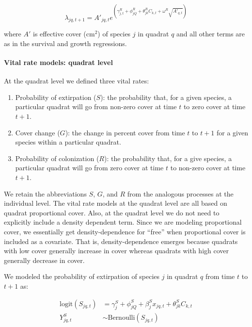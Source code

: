 \documentclass[12pt,]{article}
\begin{document}
\begin{equation}
\lambda_{jq,t+1} = A'_{jq,t}e^{(\gamma^{R}_{j,t} + \phi^{R}_{jQ} + \theta^{R}_{jk}C_{k,t} + \omega^{R}\sqrt{A'_{q,t}})}
\end{equation}

where $A'$ is effective cover ($\text{cm}^2$) of species $j$ in quadrat
$q$ and all other terms are as in the survival and growth regressions.

\paragraph{Vital rate models: quadrat
level}\label{vital-rate-models-quadrat-level}

At the quadrat level we defined three vital rates:

\begin{enumerate}
\def\labelenumi{\arabic{enumi}.}
\itemsep1pt\parskip0pt
\item
  Probability of extirpation ($S$): the probability that, for a given
  species, a particular quadrat will go from non-zero cover at time $t$
  to zero cover at time $t+1$.
\item
  Cover change ($G$): the change in percent cover from time $t$ to $t+1$
  for a given species within a particular quadrat.
\item
  Probability of colonization ($R$): the probability that, for a give
  species, a particular quadrat will go from zero cover at time $t$ to
  non-zero cover at time $t+1$.
\end{enumerate}

We retain the abbreviations $S$, $G$, and $R$ from the analogous
processes at the individual level. The vital rate models at the quadrat
level are all based on quadrat proportional cover. Also, at the quadrat
level we do not need to explicitly include a density dependent term.
Since we are modeling proportional cover, we essentially get
density-dependence for ``free'' when proportional cover is included as a
covariate. That is, density-dependence emerges because quadrats with low
cover generally increase in cover whereas quadrats with high cover
generally decrease in cover.

We modeled the probability of extirpation of species $j$ in quadrat $q$
from time $t$ to $t+1$ as:

\begin{align}
\text{logit}(S_{jq,t}) &= \gamma^{S}_{j} + \phi^{S}_{jQ} + \beta^{S}_{j}x_{jq,t} + \theta^{S}_{jk}C_{k,t} \\
Y^{S}_{jq,t} &\sim \text{Bernoulli}(S_{jq,t})
\end{align}
\end{document}
